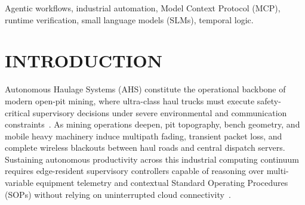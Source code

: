 \documentclass{ieeeaccess}
\providecommand{\PARstart}[2]{#1#2}
\begin{document}
\begin{keywords}
Agentic workflows, industrial automation, Model Context Protocol (MCP), runtime verification, small language models (SLMs), temporal logic.
\end{keywords}

\titlepgskip=-15pt

\maketitle

\section{INTRODUCTION}
\PARstart{A}{utonomous} Haulage Systems (AHS) constitute the operational backbone of modern open-pit mining, where ultra-class haul trucks must execute safety-critical supervisory decisions under severe environmental and communication constraints~\cite{iso17757}. As mining operations deepen, pit topography, bench geometry, and mobile heavy machinery induce multipath fading, transient packet loss, and complete wireless blackouts between haul roads and central dispatch servers. Sustaining autonomous productivity across this industrial computing continuum requires edge-resident supervisory controllers capable of reasoning over multi-variable equipment telemetry and contextual Standard Operating Procedures (SOPs) without relying on uninterrupted cloud connectivity~\cite{andrade2026mcaf}.
\end{document}
